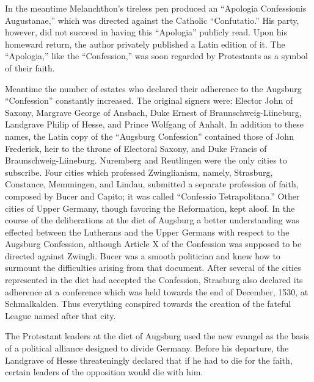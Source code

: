 In the meantime Melanchthon’s tireless pen produced an “Apologia
Confessionis Augustanae,” which was directed against the Catholic
“Confutatio.” His party, however, did not succeed in having this
“Apologia” publicly read. Upon his homeward return, the author
privately published a Latin edition of it. The “Apologia,” like the
“Confession,” was soon regarded by Protestants as a symbol of their
faith.

Meantime the number of estates who declared their adherence to
the Augsburg “Confession” constantly increased. The original signers
were: Elector John of Saxony, Margrave George of Ansbach, Duke
Ernest of Braunschweig-Liineburg, Landgrave Philip of Hesse, and
Prince Wolfgang of Anhalt. In addition to these names, the Latin
copy of the “Augsburg Confession” contained those of John Frederick, heir
to the throne of Electoral Saxony, and Duke Francis of
Braunschweig-Liineburg. Nuremberg and Reutlingen were the only
cities to subscribe. Four cities which professed Zwinglianism, namely,
Strasburg, Constance, Memmingen, and Lindau, submitted a separate profession
of faith, composed by Bucer and Capito; it was
called “Confessio Tetrapolitana.” Other cities of Upper Germany,
though favoring the Reformation, kept aloof. In the course of the
deliberations at the diet of Augsburg a better understanding was
effected between the Lutherans and the Upper Germans with respect
to the Augsburg Confession, although Article X of the Confession
was supposed to be directed against Zwingli. Bucer was a smooth
politician and knew how to surmount the difficulties arising from that
document. After several of the cities represented in the diet had accepted
the Confession, Strasburg also declared its adherence at a conference
which was held towards the end of December, 1530, at
Schmalkalden. Thus everything conspired towards the creation of the
fateful League named after that city.

The Protestant leaders at the diet of Augsburg used the new
evangel as the basis of a political alliance designed to divide Germany.
Before his departure, the Landgrave of Hesse threateningly declared
that if he had to die for the faith, certain leaders of the opposition
would die with him.

